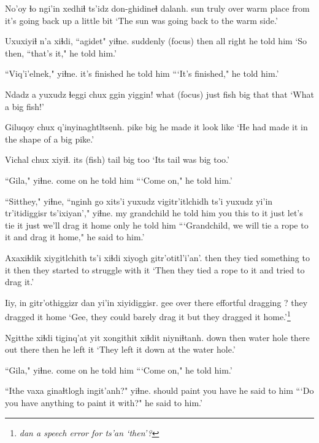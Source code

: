 \documentclass[12pt]{article}
\begin{document}
\gll No'oy ɬo ngi'in xedhiɬ ts'idz don-ghidineɬ dalanh.
sun truly over {warm place} from {it's going back up} {a little bit}
\glt `The sun was going back to the warm side.'
\glend

\gll Uxuxiyiɬ n'a xiɬdi, ``agidet" yiɬne.
suddenly {(focus)} then {all right} {he told him}
\glt `So then, ``that's it," he told him.'
\glend

\gll ``Viq'i'elnek," yiɬne. 
{it's finished} {he told him}
\glt ```It's finished," he told him.'
\glend

\gll Ndadz a yuxudz ɬeggi chux ggin yiggin!
what {(focus)} just fish big that that
\glt `What a big fish!'
\glend

\gll Giluqoy chux q'inyinaghtltsenh.
pike big {he made it look like}
\glt `He had made it in the shape of a big pike.'
\glend

\gll Vichal chux xiyiɬ. 
{its (fish) tail} big too
\glt `Its tail was big too.'
\glend

\gll ``Gila," yiɬne. 
{come on} {he told him}
\glt ```Come on," he told him.'
\glend

\gll ``Sitthey," yiɬne, ``nginh go xits'i yuxudz vigitr'itlchidh ts'i yuxudz {yi'in tr'itidiggisr} ts'ixiyan'," yiɬne. 
{my grandchild} {he told him} you this {to it} just {let's tie it} {} just {we'll drag it home} only {he told him}
\glt ```Grandchild, we will tie a rope to it and drag it home," he said to him.' 
\glend

\gll Axaxiɬdik xiygitlchith ts'i xiɬdi {xiyogh gitr'otitl'i'an'.} 
then {they tied something to it} {} then {they started to struggle with it} 
\glt `Then they tied a rope to it and tried to drag it.'
\glend

\gll Iiy, in gitr'othiggizr dan {yi'in xiyidiggisr.} 
gee {over there} {effortful dragging} ? {they dragged it home}
\glt `Gee, they could barely drag it but they dragged it home.'\footnote{\em dan \em a speech error for \em ts'an \em `then'?}
\glend

\gll Ngitthe xiɬdi tiginq'at yit xongithit xiɬdit niyniɬtanh. 
down then {water hole} there {out there} then {he left it}
\glt `They left it down at the water hole.'
\glend

\gll ``Gila," yiɬne.
{come on} {he told him}
\glt ```Come on," he told him.'
\glend

\gll ``Ithe {vaxa ginaɬtlogh} ingit'anh?" yiɬne. 
should paint {you have} {he said to him}
\glt ```Do you have anything to paint it with?" he said to him.'
\glend
\end{document}
